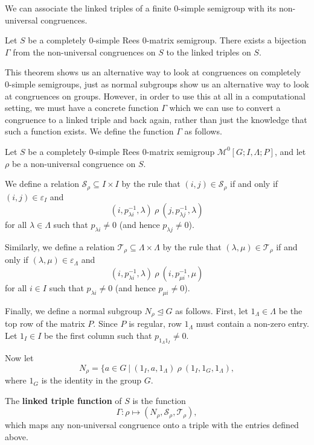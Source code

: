 We can associate the linked triples of a finite 0-simple semigroup with its
non-universal congruences.

\begin{theorem}
  \label{thm:linked-triple}
  Let $S$ be a completely 0-simple Rees 0-matrix semigroup.  There exists a
  bijection $\Gamma$ from the non-universal congruences on $S$ to the linked
  triples on $S$.
\end{theorem}

This theorem shows us an alternative way to look at congruences on completely
0-simple semigroups, just as normal subgroups show us an alternative way to look
at congruences on groups.  However, in order to use this at all in a
computational setting, we must have a concrete function $\Gamma$ which we can
use to convert a congruence to a linked triple and back again, rather than just
the knowledge that such a function exists.  We define the function $\Gamma$ as
follows.

\begin{definition}
  Let $S$ be a completely 0-simple Rees 0-matrix semigroup
  $\mathcal{M}^0[G;I,\Lambda;P]$, and let $\rho$ be a non-universal congruence
  on $S$.

  We define a relation $\mathcal{S}_\rho \subseteq I \times I$ by the rule that
  $(i,j) \in \mathcal{S}_\rho$ if and only if $(i,j) \in \varepsilon_I$ and
  $$(i, p_{\lambda i}^{-1}, \lambda) ~\rho~ (j, p_{\lambda j}^{-1}, \lambda)$$
  for all $\lambda \in \Lambda$ such that $p_{\lambda i} \neq 0$ (and hence
  $p_{\lambda j} \neq 0$).

  Similarly, we define a relation
  $\mathcal{T}_\rho \subseteq \Lambda \times \Lambda$ by the rule that
  $(\lambda,\mu) \in \mathcal{T}_\rho$ if and only if
  $(\lambda,\mu) \in \varepsilon_\Lambda$ and
  $$(i, p_{\lambda i}^{-1}, \lambda) ~\rho~ (i, p_{\mu i}^{-1}, \mu)$$
  for all $i \in I$ such that $p_{\lambda i} \neq 0$ (and hence
  $p_{\mu i} \neq 0$).

  Finally, we define a normal subgroup $N_\rho \trianglelefteq G$ as follows.
  First, let $1_\Lambda \in \Lambda$ be the top row of the matrix $P$.  Since
  $P$ is regular, row $1_\Lambda$ must contain a non-zero entry.  Let
  $1_I \in I$ be the first column such that $p_{1_\Lambda 1_I} \neq 0$.

  Now let
  $$N_\rho = \{a \in G ~|~ (1_I,a,1_\Lambda) ~\rho~ (1_I, 1_G, 1_\Lambda),$$
  where $1_G$ is the identity in the group $G$.

  The \textbf{linked triple function} of $S$ is the function
  $$\Gamma: \rho \mapsto (N_\rho, \mathcal{S}_\rho, \mathcal{T}_\rho),$$
  which maps any non-universal congruence onto a triple with the entries defined
  above.
\end{definition}

